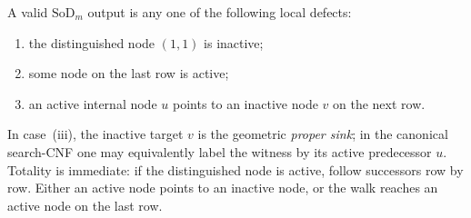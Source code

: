 \documentclass[11pt]{article}
\theoremstyle{definition}
\newcommand{\SoD}{\mathrm{SoD}}
\begin{document}
A valid $\SoD_m$ output is any one of the following local defects:
\begin{enumerate}[label=(\roman*),leftmargin=2.3em]
\item the distinguished node $(1,1)$ is inactive;
\item some node on the last row is active;
\item an active internal node $u$ points to an inactive node $v$ on the next row.
\end{enumerate}
In case~(iii), the inactive target $v$ is the geometric \emph{proper sink}; in the
canonical search-CNF one may equivalently label the witness by its active predecessor
$u$.  Totality is immediate: if the distinguished node is active, follow successors
row by row.  Either an active node points to an inactive node, or the walk reaches an
active node on the last row.
\end{document}
